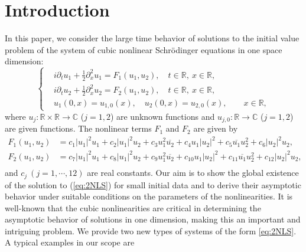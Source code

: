 \documentclass[11pt,a4paper,twosides]{amsart}
\theoremstyle{plain}
\theoremstyle{remark}
\numberwithin{equation}{section}
\newcommand{\C}{\mathbb{C}}
\newcommand{\R}{\mathbb{R}}
\theoremstyle{definition}
\newcommand{\1}{{\bf 1}_{\{|x| < |t|\}}}
\newcommand{\ol}{\overline}
\begin{document}
\section{Introduction}
In this paper, we consider the large time behavior of solutions to
the initial value problem of the system of cubic nonlinear Schr\"odinger equations in one space dimension:
\begin{equation}
  \label{eq:2NLS}
  \left\{
  \begin{aligned}
     & i\partial_t u_1 + \frac12 \partial_x^2 u_1 =
    F_1(u_1,u_2), \quad t \in \R,\ x \in \R,                                \\
     & i\partial_t u_2 + \frac12 \partial_x^2 u_2 =
    F_2(u_1,u_2),
    \quad t \in \R,\ x \in \R,                                              \\
     & u_1(0,x) = u_{1,0}(x), \quad u_2(0,x) = u_{2,0}(x), \qquad x \in \R,
  \end{aligned}
  \right.
\end{equation}
where $u_j:\R\times\R\to\C$ ($j=1,2$) are unknown functions
and $u_{j,0}:\R\to\C$ ($j=1,2$) are given functions. The nonlinear terms
$F_1$ and $F_2$ are given by
\begin{equation*}
  \begin{aligned}
    F_1(u_1,u_2)
     & = c_1|u_1|^2u_1 + c_2|u_1|^2u_2 + c_3u_1^2\ol{u_2}
    + c_4 u_1|u_2|^2 + c_5 \ol{u_1}u_2^2 + c_6|u_2|^2u_2,          \\
    F_2(u_1,u_2)
     & = c_7|u_1|^2u_1 + c_8|u_1|^2u_2 + c_9u_1^2\ol{u_2}
    + c_{10} u_1|u_2|^2 + c_{11} \ol{u_1}u_2^2 + c_{12}|u_2|^2u_2, \\
  \end{aligned}
\end{equation*}
and
$ c_j\ (j = 1, \cdots, 12)$ are real constants.
Our aim is to show the global existence of the solution 
to (\ref{eq:2NLS}) for small initial data and 
to derive their asymptotic behavior under suitable conditions on the parameters of 
the nonlinearities. It is well-known that the cubic nonlinearities are critical 
in determining the asymptotic behavior of solutions in one dimension, making this an important and intriguing 
problem. 
We provide two new types of systems of the form \eqref{eq:2NLS}. A typical examples in our scope are
\end{document}
